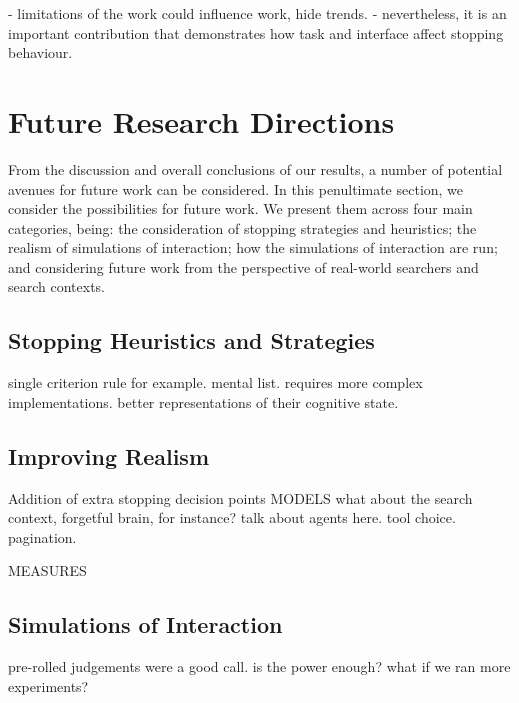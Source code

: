 - limitations of the work could influence work, hide trends.
- nevertheless, it is an important contribution that demonstrates how task and interface affect stopping behaviour.

\section{Future Research Directions}\label{sec:conclusions:future}
From the discussion and overall conclusions of our results, a number of potential avenues for future work can be considered. In this penultimate section, we consider the possibilities for future work. We present them across four main categories, being: the consideration of stopping strategies and heuristics; the realism of simulations of interaction; how the simulations of interaction are run; and considering future work from the perspective of real-world searchers and search contexts.

\subsection{Stopping Heuristics and Strategies}


single criterion rule for example.
mental list.
requires more complex implementations. better representations of their cognitive state.



\subsection{Improving Realism}


Addition of extra stopping decision points
MODELS
what about the search context, forgetful brain, for instance?
talk about agents here.
tool choice.
pagination.

MEASURES

\subsection{Simulations of Interaction}

pre-rolled judgements were a good call.
is the power enough? what if we ran more experiments?

